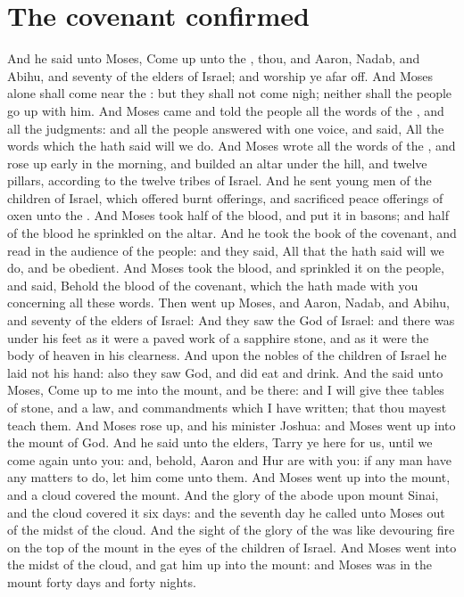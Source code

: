 \section*{The covenant confirmed}
\begin{biblechapter} %
\verse And he said unto Moses, Come up unto the \LORD, thou, and Aaron, Nadab, and Abihu, and seventy of the elders of Israel; and worship ye afar off.
\verse And Moses alone shall come near the \LORD: but they shall not come nigh; neither shall the people go up with him.
\verse And Moses came and told the people all the words of the \LORD, and all the judgments: and all the people answered with one voice, and said, All the words which the \LORD hath said will we do.
\verse And Moses wrote all the words of the \LORD, and rose up early in the morning, and builded an altar under the hill, and twelve pillars, according to the twelve tribes of Israel.
\verse And he sent young men of the children of Israel, which offered burnt offerings, and sacrificed peace offerings of oxen unto the \LORD.
\verse And Moses took half of the blood, and put it in basons; and half of the blood he sprinkled on the altar.
\verse And he took the book of the covenant, and read in the audience of the people: and they said, All that the \LORD hath said will we do, and be obedient.
\verse And Moses took the blood, and sprinkled it on the people, and said, Behold the blood of the covenant, which the \LORD hath made with you concerning all these words.
\verse Then went up Moses, and Aaron, Nadab, and Abihu, and seventy of the elders of Israel:
\verse And they saw the God of Israel: and there was under his feet as it were a paved work of a sapphire stone, and as it were the body of heaven in his clearness.
\verse And upon the nobles of the children of Israel he laid not his hand: also they saw God, and did eat and drink.
\verse And the \LORD said unto Moses, Come up to me into the mount, and be there: and I will give thee tables of stone, and a law, and commandments which I have written; that thou mayest teach them.
\verse And Moses rose up, and his minister Joshua: and Moses went up into the mount of God.
\verse And he said unto the elders, Tarry ye here for us, until we come again unto you: and, behold, Aaron and Hur are with you: if any man have any matters to do, let him come unto them.
\verse And Moses went up into the mount, and a cloud covered the mount.
\verse And the glory of the \LORD abode upon mount Sinai, and the cloud covered it six days: and the seventh day he called unto Moses out of the midst of the cloud.
\verse And the sight of the glory of the \LORD was like devouring fire on the top of the mount in the eyes of the children of Israel.
\verse And Moses went into the midst of the cloud, and gat him up into the mount: and Moses was in the mount forty days and forty nights.
\end{biblechapter}

